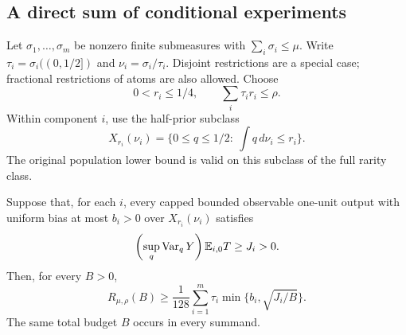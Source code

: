 \subsection{A direct sum of conditional experiments}

Let $\sigma_1,\ldots,\sigma_m$ be nonzero finite submeasures with
$\sum_i\sigma_i\le\mu$. Write $\tau_i=\sigma_i((0,1/2])$ and
$\nu_i=\sigma_i/\tau_i$. Disjoint restrictions are a special case;
fractional restrictions of atoms are also allowed. Choose
\[
 0<r_i\le1/4,\qquad \sum_i\tau_i r_i\le\rho.
\]
Within component $i$, use the half-prior subclass
\[
 X_{r_i}(\nu_i)=\{0\le q\le1/2:\ \textstyle\int q\,d\nu_i\le r_i\}.
\]
The original population lower bound is valid on this subclass of the full
rarity class.

\begin{theorem}\label{thm:additive-localization}
Suppose that, for each $i$, every capped bounded observable one-unit output
with uniform bias at most $b_i>0$ over $X_{r_i}(\nu_i)$ satisfies
\[
 \left(\sup_q\operatorname{Var}_qY\right)\mathbb E_{i,0}T\ge J_i>0.
\]
Then, for every $B>0$,
\begin{equation}\label{eq:additive-localization}
 \boxed{\quad
 R_{\mu,\rho}(B)\ge\frac1{128}
 \sum_{i=1}^m\tau_i\min\{b_i,\sqrt{J_i/B}\}.
 \quad}
\end{equation}
The same total budget $B$ occurs in every summand.
\end{theorem}

